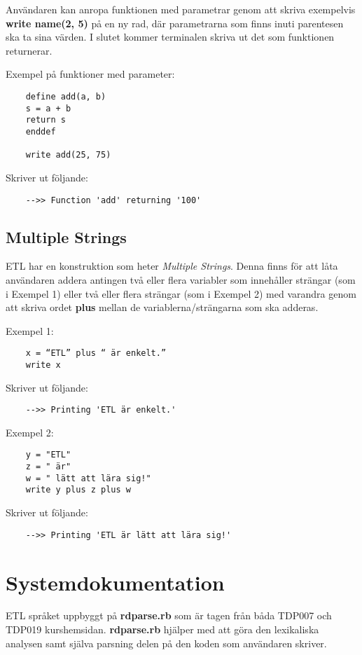 \documentclass{TDP019mall}
\begin{document}
\begin{enumerate}
Användaren kan anropa funktionen med parametrar genom att skriva exempelvis \textbf{write name(2, 5)} på en ny rad, där parametrarna 
som finns inuti parentesen ska ta sina värden. I slutet kommer terminalen skriva ut det som funktionen returnerar.  
 
 
Exempel på funktioner med parameter:
\begin{verbatim}
    define add(a, b)
    s = a + b
    return s
    enddef

    write add(25, 75)
\end{verbatim}
Skriver ut följande:
\begin{verbatim}
    -->> Function 'add' returning '100'
\end{verbatim}
\end{enumerate}


\newpage
\subsection{Multiple Strings}
ETL har en konstruktion som heter \textit{Multiple Strings}. Denna finns för att låta användaren addera antingen två eller flera variabler som innehåller strängar 
(som i Exempel 1) eller två eller flera strängar (som i Exempel 2) med varandra genom att skriva ordet \textbf{plus} mellan de variablerna/strängarna som ska adderas.

Exempel 1: 
\begin{verbatim}
    x = “ETL” plus “ är enkelt.”
    write x
\end{verbatim}
Skriver ut följande:
\begin{verbatim}
    -->> Printing 'ETL är enkelt.'
\end{verbatim}

Exempel 2:

\begin{verbatim}
    y = "ETL"
    z = " är"
    w = " lätt att lära sig!"
    write y plus z plus w
\end{verbatim}
 
Skriver ut följande:
\begin{verbatim}
    -->> Printing 'ETL är lätt att lära sig!'
\end{verbatim}


\newpage
\section{Systemdokumentation}
ETL språket uppbyggt på \textbf{rdparse.rb} som är tagen från båda TDP007 och TDP019 kurshemsidan. \textbf{rdparse.rb} hjälper med att göra den lexikaliska 
analysen samt själva parsning delen på den koden som användaren skriver. 
\end{document}
